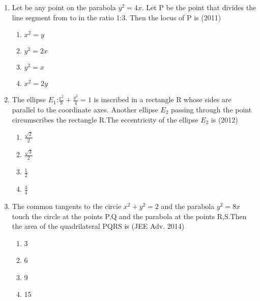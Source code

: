 \documentclass[journal,12pt,onecolumn]{IEEEtran}
\theoremstyle{remark}
\begin{document}
\begin{enumerate}
	\item Let  be any point on the parabola $y^2=4x$. Let P be the point that divides the line segment from  to  in the ratio 1:3. Then the locus of P is  \hfill(2011)\\
		\begin{enumerate}
			\item $x^2=y$
			\item $y^2=2x$
			\item $y^2=x$
			\item $x^2=2y$
		\end{enumerate}

	\item The ellipse $E_{1}$:$\frac{x^2}{9}+\frac{y^2}{4}=1$ is inscribed in a rectangle R whose sides are parallel to the coordinate axes. Another ellipse $E_{2}$ passing through the point  circumscribes the rectangle R.The eccentricity of the ellipse $E_{2}$ is \hfill(2012)\\

		\begin{enumerate}
			\item $\frac{\sqrt{2}}{2}$
			\item $\frac{\sqrt{3}}{2}$
			\item $\frac{1}{2}$
			\item $\frac{3}{4}$
		\end{enumerate}

	\item The common tangents to the circie $x^2+y^2=2$ and the parabola $y^2=8x$ touch the circle at the points P,Q and the parabola at the points R,S.Then the area of the quadrilateral PQRS is \hfill(JEE Adv. 2014)\\
		\begin{enumerate}
			\item 3
			\item 6
			\item 9
			\item 15
		\end{enumerate}
		\vspace{0.5cm}
\end{enumerate}
\end{document}

